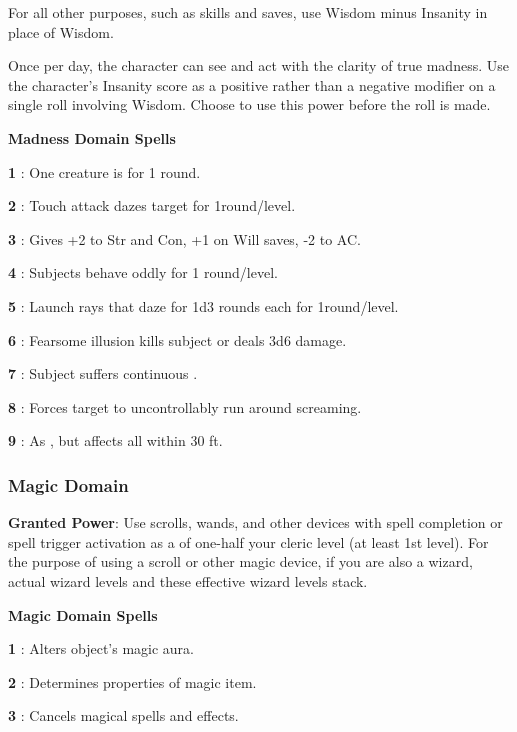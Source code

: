 For all other purposes, such as skills and saves, use Wisdom minus Insanity in place of Wisdom. 

Once per day, the character can see and act with the clarity of true madness. Use the character's Insanity score as a positive rather than a negative modifier on a single roll involving Wisdom. Choose to use this power before the roll is made.

\textbf{Madness Domain Spells}

\textbf{1} : One creature is  for 1 round.

\textbf{2} : Touch attack dazes target for 1round/level.

\textbf{3} : Gives +2 to Str and Con, +1 on Will saves, -2 to AC.

\textbf{4} : Subjects behave oddly for 1 round/level.

\textbf{5} : Launch rays that daze for 1d3 rounds each for 1round/level.

\textbf{6} : Fearsome illusion kills subject or deals 3d6 damage.

\textbf{7} : Subject suffers continuous .

\textbf{8} : Forces target to uncontrollably run around screaming.

\textbf{9} : As , but affects all within 30 ft.

\subsubsection{Magic Domain}

\textbf{Granted Power}: Use scrolls, wands, and other devices with spell completion or spell trigger activation as a  of one-half your cleric level (at least 1st level). For the purpose of using a scroll or other magic device, if you are also a wizard, actual wizard levels and these effective wizard levels stack.

\textbf{Magic Domain Spells}

\textbf{1} : Alters object's magic aura.

\textbf{2} : Determines properties of magic item.

\textbf{3} : Cancels magical spells and effects.

